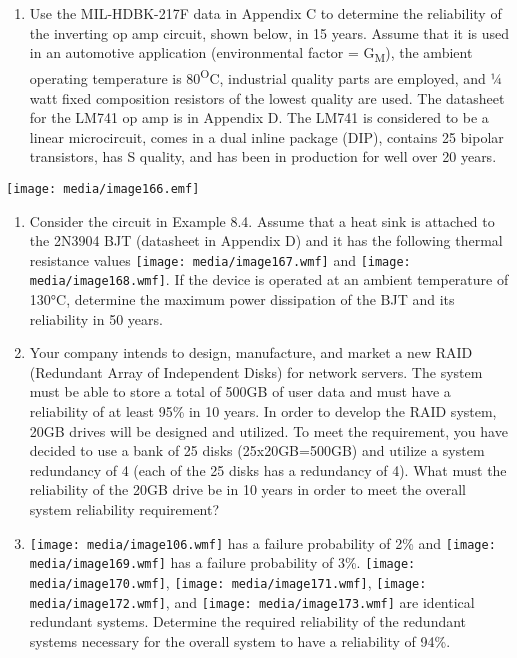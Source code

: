 \begin{enumerate}
\def\labelenumi{\arabic{enumi}.}
\setcounter{enumi}{7}
\item
  Use the MIL-HDBK-217F data in Appendix C to determine the reliability
  of the inverting op amp circuit, shown below, in 15 years. Assume that
  it is used in an automotive application (environmental factor =
  G\textsubscript{M}), the ambient operating temperature is
  80\textsuperscript{O}C, industrial quality parts are employed, and ¼
  watt fixed composition resistors of the lowest quality are used. The
  datasheet for the LM741 op amp is in Appendix D. The LM741 is
  considered to be a linear microcircuit, comes in a dual inline package
  (DIP), contains 25 bipolar transistors, has S quality, and has been in
  production for well over 20 years.
\end{enumerate}

\texttt{[image: media/image166.emf]}

\begin{enumerate}
\def\labelenumi{\arabic{enumi}.}
\setcounter{enumi}{8}
\item
  Consider the circuit in Example 8.4. Assume that a heat sink is
  attached to the 2N3904 BJT (datasheet in Appendix D) and it has the
  following thermal resistance values
  \texttt{[image: media/image167.wmf]} and
  \texttt{[image: media/image168.wmf]}. If the device is operated at an
  ambient temperature of 130°C, determine the maximum power dissipation
  of the BJT and its reliability in 50 years.
\item
  Your company intends to design, manufacture, and market a new RAID
  (Redundant Array of Independent Disks) for network servers. The system
  must be able to store a total of 500GB of user data and must have a
  reliability of at least 95\% in 10 years. In order to develop the RAID
  system, 20GB drives will be designed and utilized. To meet the
  requirement, you have decided to use a bank of 25 disks
  (25x20GB=500GB) and utilize a system redundancy of 4 (each of the 25
  disks has a redundancy of 4). What must the reliability of the 20GB
  drive be in 10 years in order to meet the overall system reliability
  requirement?
\item
  \texttt{[image: media/image106.wmf]} has a failure probability of 2\%
  and \texttt{[image: media/image169.wmf]} has a failure probability of
  3\%. \texttt{[image: media/image170.wmf]},
  \texttt{[image: media/image171.wmf]},
  \texttt{[image: media/image172.wmf]}, and
  \texttt{[image: media/image173.wmf]} are identical redundant systems.
  Determine the required reliability of the redundant systems necessary
  for the overall system to have a reliability of 94\%.
\end{enumerate}

